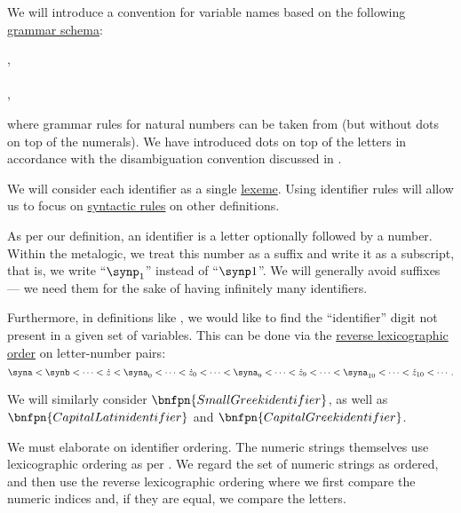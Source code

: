 \begin{definition}\label{def:variable_identifier}\mimprovised
  We will introduce a convention for variable names based on the following \hyperref[def:formal_grammar/schema]{grammar schema}:
  \begin{bnf*}
         {\bnftsq{\( \syna \)} \bnfor \bnftsq{\( \synb \)} \bnfor \cdots \bnfor {} \bnfor {}}, \\
     { \bnfor} \\
    , \\
  \end{bnf*}
  where grammar rules for natural numbers can be taken from  (but without dots on top of the numerals). We have introduced dots on top of the letters in accordance with the disambiguation convention discussed in .

  We will consider each identifier as a single \hyperref[con:abstract_syntax_tree/lexical]{lexeme}. Using identifier rules will allow us to focus on \hyperref[con:abstract_syntax_tree/syntactic]{syntactic rules} on other definitions.

  As per our definition, an identifier is a letter optionally followed by a number. Within the metalogic, we treat this number as a suffix and write it as a subscript, that is, we write \enquote{\( \synp_1 \)} instead of \enquote{\( \synp1 \)}. We will generally avoid suffixes --- we need them for the sake of having infinitely many identifiers.

  Furthermore, in definitions like , we would like to find the \enquote{identifier} digit not present in a given set of variables. This can be done via the \hyperref[thm:def:well_ordered_set/lexicographic]{reverse lexicographic order} on letter-number pairs:
  \begin{equation*}
    \syna < \synb < \cdots < \syn z < \syna_0 < \cdots < \syn z_0 < \cdots < \syna_9 < \cdots < \syn z_9 < \cdots < \syna_{10} < \cdots < \syn z_{10} < \cdots.
  \end{equation*}

  We will similarly consider \( \bnfpn{Small Greek identifier} \), as well as \( \bnfpn{Capital Latin identifier} \) and \( \bnfpn{Capital Greek identifier} \).
\end{definition}
\begin{comments}
  \item We must elaborate on identifier ordering. The numeric strings themselves use lexicographic ordering as per . We regard the set of numeric strings as ordered, and then use the reverse lexicographic ordering where we first compare the numeric indices and, if they are equal, we compare the letters.
\end{comments}

